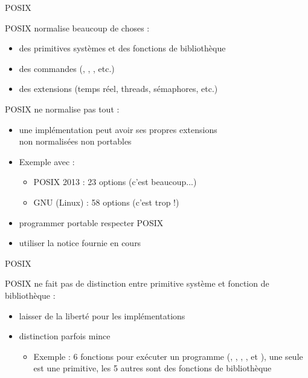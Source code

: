 \begin {frame} {POSIX}

    POSIX normalise beaucoup de choses :

    \begin {itemize}
	\item des primitives systèmes et des fonctions de bibliothèque
	\item des commandes (, , , etc.)
	\item des extensions (temps réel, threads, sémaphores, etc.)
    \end {itemize}

    \vspace* {3mm}

    POSIX ne normalise pas tout :
    \begin {itemize}
	\item une implémentation peut avoir ses propres extensions \\
	    \implique non normalisées \implique non portables
	\item Exemple avec  :
	    \begin {itemize}
		\item POSIX 2013 : 23 options (c'est beaucoup...) \\
		\item GNU (Linux) : 58 options (c'est trop !) \\
	    \end {itemize}
	\item programmer portable \implique respecter POSIX
	\item utiliser la notice fournie en cours

    \end {itemize}

\end {frame}

\begin {frame} {POSIX}

    POSIX ne fait pas de distinction entre primitive système et fonction
    de bibliothèque :

    \begin {itemize}
	\item laisser de la liberté pour les implémentations
	\item distinction parfois mince
	    \begin {itemize}
		\item Exemple : 6 fonctions pour exécuter un programme
		    (, , ,
		    ,  et ),
		    une seule est une primitive, les 5 autres sont des
		    fonctions de bibliothèque
	    \end {itemize}
    \end {itemize}
\end {frame}


